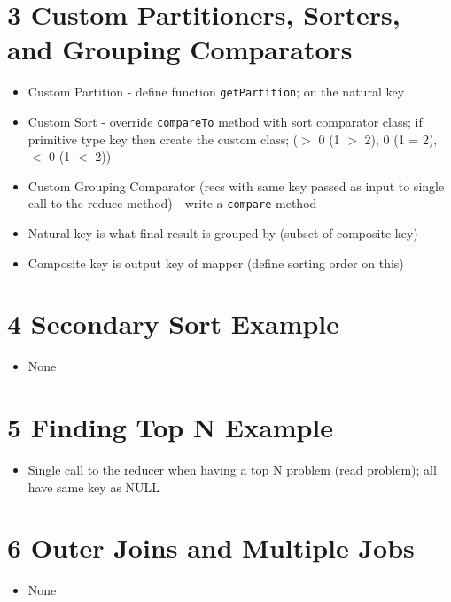 \documentclass[12pt]{article}
\begin{document}
\section*{3 Custom Partitioners, Sorters, and Grouping Comparators}
\begin{itemize}
    \item Custom Partition - define function \texttt{getPartition}; on the natural key
    \item Custom Sort - override \texttt{compareTo} method with sort comparator class;
    if primitive type key then create the custom class; ($>$ 0 (1 $>$ 2), 0 (1 = 2), $<$ 0 (1 $<$ 2))
    \item Custom Grouping Comparator (recs with same key passed as input to single 
    call to the reduce method) - write a \texttt{compare} method
    \item Natural key is what final result is grouped by (subset of composite key)
    \item Composite key is output key of mapper (define sorting order on this)
\end{itemize}

\section*{4 Secondary Sort Example}
\begin{itemize}
    \item None
\end{itemize}

\section*{5 Finding Top N Example}
\begin{itemize}
    \item Single call to the reducer when having a top N problem (read problem); all 
    have same key as NULL
\end{itemize}

\section*{6 Outer Joins and Multiple Jobs}
\begin{itemize}
    \item None
\end{itemize}
\end{document}
